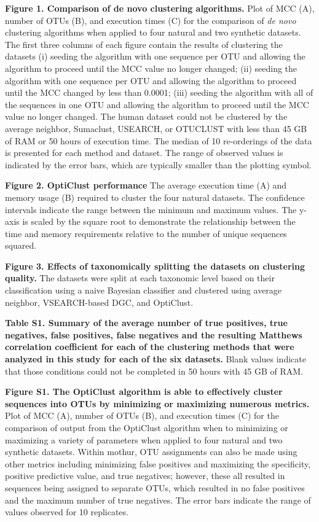 \documentclass[11pt,]{article}
\begin{document}
\newpage

\textbf{Figure 1. Comparison of de novo clustering algorithms.} Plot of
MCC (A), number of OTUs (B), and execution times (C) for the comparison
of \emph{de novo} clustering algorithms when applied to four natural and
two synthetic datasets. The first three columns of each figure contain
the results of clustering the datasets (i) seeding the algorithm with
one sequence per OTU and allowing the algorithm to proceed until the MCC
value no longer changed; (ii) seeding the algorithm with one sequence
per OTU and allowing the algorithm to proceed until the MCC changed by
less than 0.0001; (iii) seeding the algorithm with all of the sequences
in one OTU and allowing the algorithm to proceed until the MCC value no
longer changed. The human dataset could not be clustered by the average
neighbor, Sumaclust, USEARCH, or OTUCLUST with less than 45 GB of RAM or
50 hours of execution time. The median of 10 re-orderings of the data is
presented for each method and dataset. The range of observed values is
indicated by the error bars, which are typically smaller than the
plotting symbol.

\textbf{Figure 2. OptiClust performance} The average execution time (A)
and memory usage (B) required to cluster the four natural datasets. The
confidence intervals indicate the range between the minimum and maximum
values. The y-axis is scaled by the square root to demonstrate the
relationship between the time and memory requirements relative to the
number of unique sequences squared.

\textbf{Figure 3. Effects of taxonomically splitting the datasets on
clustering quality.} The datasets were split at each taxonomic level
based on their classification using a naive Bayesian classifier and
clustered using average neighbor, VSEARCH-based DGC, and OptiClust.

\newpage

\textbf{Table S1. Summary of the average number of true positives, true
negatives, false positives, false negatives and the resulting Matthews
correlation coefficient for each of the clustering methods that were
analyzed in this study for each of the six datasets.} Blank values
indicate that those conditions could not be completed in 50 hours with
45 GB of RAM.

\textbf{Figure S1. The OptiClust algorithm is able to effectively
cluster sequences into OTUs by minimizing or maximizing numerous
metrics.} Plot of MCC (A), number of OTUs (B), and execution times (C)
for the comparison of output from the OptiClust algorithm when to
minimizing or maximizing a variety of parameters when applied to four
natural and two synthetic datasets. Within mothur, OTU assignments can
also be made using other metrics including minimizing false positives
and maximizing the specificity, positive predictive value, and true
negatives; however, these all resulted in sequences being assigned to
separate OTUs, which resulted in no false positives and the maximum
number of true negatives. The error bars indicate the range of values
observed for 10 replicates.
\end{document}
